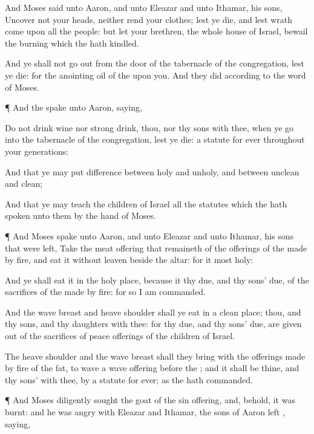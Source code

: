 {And
Moses
said unto
Aaron, and unto
Eleazar and unto
Ithamar, his
sons,
Uncover not your
heads, neither
rend your
clothes; lest ye
die, and lest
wrath come upon all the
people: but let your
brethren, the whole
house of
Israel,
bewail the
burning which the
{} hath
kindled.

And ye shall not go
out from the
door of the
tabernacle of the
congregation, lest ye
die: for the
anointing
oil of the
{}
{} upon you. And they
did according to the
word of
Moses.


\par }{\PP {}¶ And the
{}
spake unto
Aaron,
saying,

Do not
drink
wine nor strong
drink, thou, nor thy
sons with thee, when ye
go into the
tabernacle of the
congregation, lest ye
die:
{} a
statute for
ever throughout your
generations:

And that ye may put
difference between
holy and
unholy, and between
unclean and
clean;

And that ye may
teach the
children of
Israel all the
statutes which the
{} hath
spoken unto them by the
hand of
Moses.


\par }{\PP {}¶ And
Moses
spake unto
Aaron, and unto
Eleazar and unto
Ithamar, his
sons that were
left,
Take the meat
offering that
remaineth of the
offerings of the
{} made by
fire, and
eat it without
leaven
beside the
altar: for it
{}
most
holy:

And ye shall
eat it in the
holy
place, because it
{} thy
due, and thy
sons’
due, of the
sacrifices of the
{} made by
fire: for so I am
commanded.

And the
wave
breast and
heave
shoulder shall ye
eat in a
clean
place; thou, and thy
sons, and thy
daughters with thee: for
{} thy
due, and thy
sons’
due,
{} are
given out of the
sacrifices of peace
offerings of the
children of
Israel.

The
heave
shoulder and the
wave
breast shall they
bring with the offerings made by
fire of the
fat, to
wave
{} a wave
offering
before the
{}; and it shall be thine, and thy
sons’ with thee, by a
statute for
ever; as the
{} hath
commanded.


\par }{\PP {}¶ And
Moses
diligently
sought the
goat of the sin
offering, and, behold, it was
burnt: and he was
angry with
Eleazar and
Ithamar, the
sons of
Aaron
{}
left
{},
saying,

}
